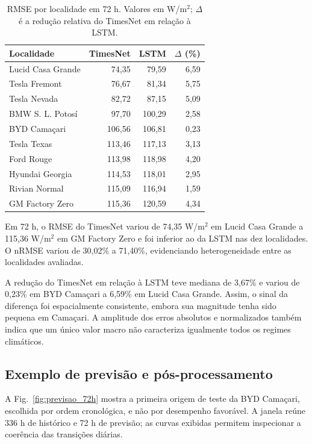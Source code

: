 \documentclass[10pt,conference,a4paper]{IEEEtran}
\begin{document}
\begin{table}[!t]
\centering
\caption{RMSE por localidade em 72 h. Valores em W/m$^2$; $\Delta$ é a redução relativa do TimesNet em relação à LSTM.}
\label{tab:metricas_locais}
\scriptsize
\setlength{\tabcolsep}{2.4pt}
\renewcommand{\arraystretch}{0.94}
\begin{tabular}{lrrr}
\toprule
\textbf{Localidade} & \textbf{TimesNet} & \textbf{LSTM} & \textbf{$\Delta$ (\%)} \\
\midrule
Lucid Casa Grande & 74,35 & 79,59 & 6,59 \\
Tesla Fremont & 76,67 & 81,34 & 5,75 \\
Tesla Nevada & 82,72 & 87,15 & 5,09 \\
BMW S. L. Potosí & 97,70 & 100,29 & 2,58 \\
BYD Camaçari & 106,56 & 106,81 & 0,23 \\
Tesla Texas & 113,46 & 117,13 & 3,13 \\
Ford Rouge & 113,98 & 118,98 & 4,20 \\
Hyundai Georgia & 114,53 & 118,01 & 2,95 \\
Rivian Normal & 115,09 & 116,94 & 1,59 \\
GM Factory Zero & 115,36 & 120,59 & 4,34 \\
\bottomrule
\end{tabular}
\end{table}

Em 72 h, o RMSE do TimesNet variou de 74,35 W/m$^2$ em Lucid Casa Grande a
115,36 W/m$^2$ em GM Factory Zero e foi inferior ao da LSTM nas dez
localidades. O nRMSE variou de 30,02\% a 71,40\%, evidenciando heterogeneidade
entre as localidades avaliadas.

A redução do TimesNet em relação à LSTM teve mediana de 3,67\% e variou de
0,23\% em BYD Camaçari a 6,59\% em Lucid Casa Grande. Assim, o sinal da
diferença foi espacialmente consistente, embora sua magnitude tenha sido
pequena em Camaçari. A amplitude dos erros absolutos e normalizados também
indica que um único valor macro não caracteriza igualmente todos os regimes
climáticos.

\subsection{Exemplo de previsão e pós-processamento}

A Fig.~\ref{fig:previsao_72h} mostra a primeira origem de teste da BYD
Camaçari, escolhida por ordem cronológica, e não por desempenho favorável. A
janela reúne 336 h de histórico e 72 h de previsão; as curvas exibidas permitem
inspecionar a coerência das transições diárias.
\end{document}

